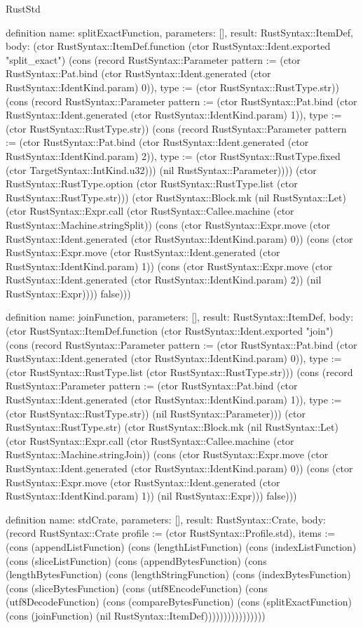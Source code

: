 \begin{lexlean}{RustStd}
\begin{semanticmodule}
definition{
  name: splitExactFunction,
  parameters: [],
  result: RustSyntax::ItemDef,
  body: (ctor RustSyntax::ItemDef.function (ctor RustSyntax::Ident.exported "split_exact") (cons (record RustSyntax::Parameter {pattern := (ctor RustSyntax::Pat.bind (ctor RustSyntax::Ident.generated (ctor RustSyntax::IdentKind.param) 0)), type := (ctor RustSyntax::RustType.str)}) (cons (record RustSyntax::Parameter {pattern := (ctor RustSyntax::Pat.bind (ctor RustSyntax::Ident.generated (ctor RustSyntax::IdentKind.param) 1)), type := (ctor RustSyntax::RustType.str)}) (cons (record RustSyntax::Parameter {pattern := (ctor RustSyntax::Pat.bind (ctor RustSyntax::Ident.generated (ctor RustSyntax::IdentKind.param) 2)), type := (ctor RustSyntax::RustType.fixed (ctor TargetSyntax::IntKind.u32))}) (nil RustSyntax::Parameter)))) (ctor RustSyntax::RustType.option (ctor RustSyntax::RustType.list (ctor RustSyntax::RustType.str))) (ctor RustSyntax::Block.mk (nil RustSyntax::Let) (ctor RustSyntax::Expr.call (ctor RustSyntax::Callee.machine (ctor RustSyntax::Machine.stringSplit)) (cons (ctor RustSyntax::Expr.move (ctor RustSyntax::Ident.generated (ctor RustSyntax::IdentKind.param) 0)) (cons (ctor RustSyntax::Expr.move (ctor RustSyntax::Ident.generated (ctor RustSyntax::IdentKind.param) 1)) (cons (ctor RustSyntax::Expr.move (ctor RustSyntax::Ident.generated (ctor RustSyntax::IdentKind.param) 2)) (nil RustSyntax::Expr)))) false)))
}

definition{
  name: joinFunction,
  parameters: [],
  result: RustSyntax::ItemDef,
  body: (ctor RustSyntax::ItemDef.function (ctor RustSyntax::Ident.exported "join") (cons (record RustSyntax::Parameter {pattern := (ctor RustSyntax::Pat.bind (ctor RustSyntax::Ident.generated (ctor RustSyntax::IdentKind.param) 0)), type := (ctor RustSyntax::RustType.list (ctor RustSyntax::RustType.str))}) (cons (record RustSyntax::Parameter {pattern := (ctor RustSyntax::Pat.bind (ctor RustSyntax::Ident.generated (ctor RustSyntax::IdentKind.param) 1)), type := (ctor RustSyntax::RustType.str)}) (nil RustSyntax::Parameter))) (ctor RustSyntax::RustType.str) (ctor RustSyntax::Block.mk (nil RustSyntax::Let) (ctor RustSyntax::Expr.call (ctor RustSyntax::Callee.machine (ctor RustSyntax::Machine.stringJoin)) (cons (ctor RustSyntax::Expr.move (ctor RustSyntax::Ident.generated (ctor RustSyntax::IdentKind.param) 0)) (cons (ctor RustSyntax::Expr.move (ctor RustSyntax::Ident.generated (ctor RustSyntax::IdentKind.param) 1)) (nil RustSyntax::Expr))) false)))
}

definition{
  name: stdCrate,
  parameters: [],
  result: RustSyntax::Crate,
  body: (record RustSyntax::Crate {profile := (ctor RustSyntax::Profile.std), items := (cons (appendListFunction) (cons (lengthListFunction) (cons (indexListFunction) (cons (sliceListFunction) (cons (appendBytesFunction) (cons (lengthBytesFunction) (cons (lengthStringFunction) (cons (indexBytesFunction) (cons (sliceBytesFunction) (cons (utf8EncodeFunction) (cons (utf8DecodeFunction) (cons (compareBytesFunction) (cons (splitExactFunction) (cons (joinFunction) (nil RustSyntax::ItemDef)))))))))))))))})
}


\end{semanticmodule}
\end{lexlean}
